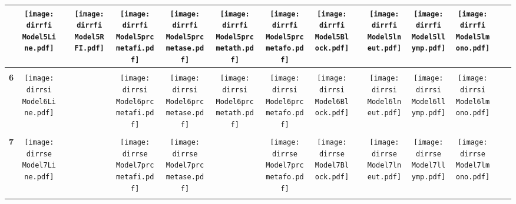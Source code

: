 \documentclass[landscape]{article}
\def \dirrfi {U:/R/RA/Data/RFI-newdata/resultsingle/Model5.Line.RFI.prcmetafi.prcmetase.prcmetath.prcmetafo.lneut.llymp.lmono.Block/}
\def \dirrsi{U:/R/RA/Data/RFI-newdata/resultsingle/Model6.Line.prcmetafi.prcmetase.prcmetath.prcmetafo.lneut.llymp.lmono.Block/}
\def \dirrse{U:/R/RA/Data/RFI-newdata/resultsingle/Model7.Line.prcmetafi.prcmetase.prcmetafo.lneut.llymp.lmono.Block/}
\begin{document}
\begin{table}
\begin{tabular}{ccccccccccccccc}
     &\texttt{[image: \\dirrfi Model5Line.pdf]}
      &
      &\texttt{[image: \\dirrfi Model5RFI.pdf]}
      &\texttt{[image: \\dirrfi Model5prcmetafi.pdf]}
      &\texttt{[image: \\dirrfi Model5prcmetase.pdf]}
      &\texttt{[image: \\dirrfi Model5prcmetath.pdf]}
      &\texttt{[image: \\dirrfi Model5prcmetafo.pdf]}
      &\texttt{[image: \\dirrfi Model5Block.pdf]}
      &
      &\texttt{[image: \\dirrfi Model5lneut.pdf]}
      &\texttt{[image: \\dirrfi Model5llymp.pdf]}
      &\texttt{[image: \\dirrfi Model5lmono.pdf]}
      &
      &
     \\[3.5pt]
     \hline
     \\[3.5pt]
     {\Huge \textbf{6}} 
      
     &\texttt{[image: \\dirrsi Model6Line.pdf]}
      &
      &
      &\texttt{[image: \\dirrsi Model6prcmetafi.pdf]}
      &\texttt{[image: \\dirrsi Model6prcmetase.pdf]}
      &\texttt{[image: \\dirrsi Model6prcmetath.pdf]}
      &\texttt{[image: \\dirrsi Model6prcmetafo.pdf]}
      &\texttt{[image: \\dirrsi Model6Block.pdf]}
      &
      &\texttt{[image: \\dirrsi Model6lneut.pdf]}
      &\texttt{[image: \\dirrsi Model6llymp.pdf]}
      &\texttt{[image: \\dirrsi Model6lmono.pdf]}
      &
      &
     \\[3.5pt]
     \hline
     \\[3.5pt]
     {\Huge \textbf{7}} 
       &\texttt{[image: \\dirrse Model7Line.pdf]}
      &
      &
      &\texttt{[image: \\dirrse Model7prcmetafi.pdf]}
      &\texttt{[image: \\dirrse Model7prcmetase.pdf]}
      &
      &\texttt{[image: \\dirrse Model7prcmetafo.pdf]}
      &\texttt{[image: \\dirrse Model7Block.pdf]}
      &
      &\texttt{[image: \\dirrse Model7lneut.pdf]}
      &\texttt{[image: \\dirrse Model7llymp.pdf]}
      &\texttt{[image: \\dirrse Model7lmono.pdf]}
      &
      &
     \\[3.5pt]
     \hline
     \\[3.5pt]

\end{tabular}
\end{table}
\end{document}
